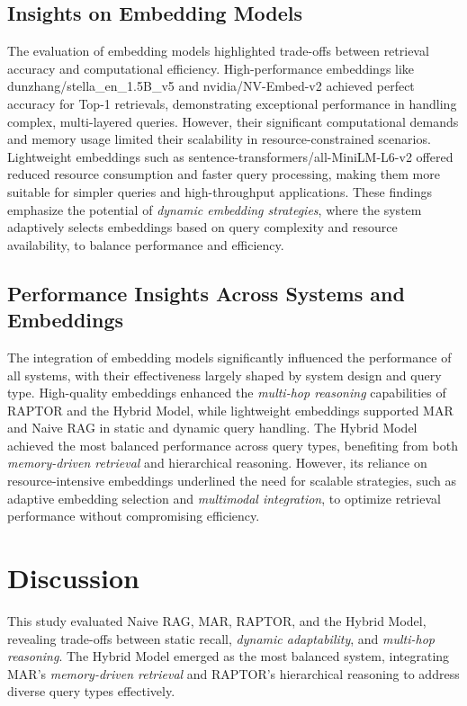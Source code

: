 \documentclass[pdflatex,sn-mathphys-num]{sn-jnl}%
\begin{document}
\subsection{Insights on Embedding Models}\label{subsec2}
The evaluation of embedding models highlighted trade-offs between retrieval accuracy and computational efficiency. High-performance embeddings like dunzhang/stella\_en\_1.5B\_v5 and nvidia/NV-Embed-v2 achieved perfect accuracy for Top-1 retrievals, demonstrating exceptional performance in handling complex, multi-layered queries. However, their significant computational demands and memory usage limited their scalability in resource-constrained scenarios. Lightweight embeddings such as sentence-transformers/all-MiniLM-L6-v2 offered reduced resource consumption and faster query processing, making them more suitable for simpler queries and high-throughput applications. These findings emphasize the potential of \emph{dynamic embedding strategies}, where the system adaptively selects embeddings based on query complexity and resource availability, to balance performance and efficiency.

\subsection{Performance Insights Across Systems and Embeddings}\label{subsec2}
The integration of embedding models significantly influenced the performance of all systems, with their effectiveness largely shaped by system design and query type. High-quality embeddings enhanced the \emph{multi-hop reasoning} capabilities of RAPTOR and the Hybrid Model, while lightweight embeddings supported MAR and Naive RAG in static and dynamic query handling. The Hybrid Model achieved the most balanced performance across query types, benefiting from both \emph{memory-driven retrieval} and hierarchical reasoning. However, its reliance on resource-intensive embeddings underlined the need for scalable strategies, such as adaptive embedding selection and \emph{multimodal integration}, to optimize retrieval performance without compromising efficiency.


\section{Discussion}\label{sec6}
This study evaluated Naive RAG, MAR, RAPTOR, and the Hybrid Model, revealing trade-offs between static recall, \emph{dynamic adaptability}, and \emph{multi-hop reasoning}. The Hybrid Model emerged as the most balanced system, integrating MAR’s \emph{memory-driven retrieval} and RAPTOR’s hierarchical reasoning to address diverse query types effectively.
\end{document}
